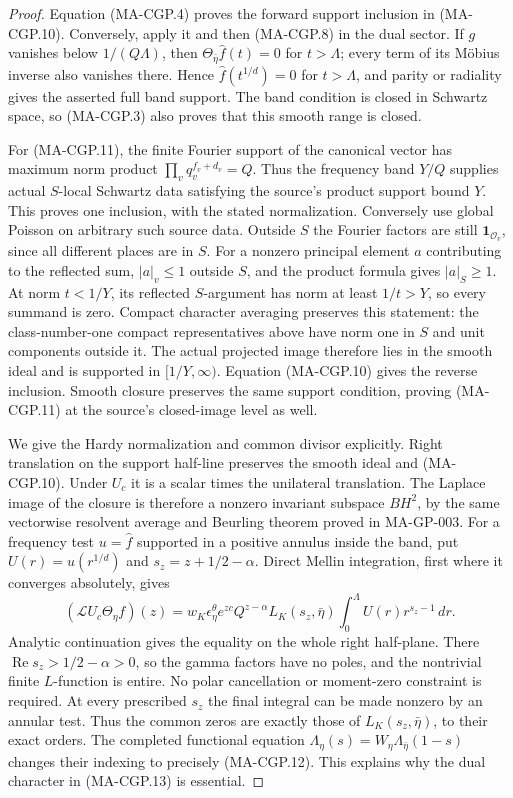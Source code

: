 \begin{proof}
Equation (MA-CGP.4) proves the forward support inclusion in
(MA-CGP.10).  Conversely, apply it and then (MA-CGP.8) in
the dual sector.  If $g$ vanishes below $1/(Q\Lambda)$,
then $\Theta_{\bar\eta}\widehat f(t)=0$ for $t>\Lambda$;
every term of its M\"obius inverse also vanishes there.
Hence $\widehat f(t^{1/d})=0$ for $t>\Lambda$, and parity
or radiality gives the asserted full band support.
The band condition is closed in Schwartz space, so (MA-CGP.3)
also proves that this smooth range is closed.

For (MA-CGP.11), the finite Fourier support of the canonical
vector has maximum norm product $\prod_v q_v^{f_v+d_v}=Q$.
Thus the frequency band $Y/Q$ supplies actual $S$-local
Schwartz data satisfying the source's product support bound
$Y$.  This proves one inclusion, with the stated normalization.
Conversely use global Poisson on arbitrary such source data.
Outside $S$ the Fourier factors are still $\mathbf1_{\mathcal O_v}$,
since all different places are in $S$.
For a nonzero principal element $a$ contributing to the reflected
sum, $|a|_v\le1$ outside $S$, and the product formula gives
$|a|_S\ge1$.  At norm $t<1/Y$, its reflected $S$-argument
has norm at least $1/t>Y$, so every summand is zero.
Compact character averaging preserves this statement: the
class-number-one compact representatives above have norm one
in $S$ and unit components outside it.
The actual projected image therefore lies in the smooth ideal
and is supported in $[1/Y,\infty)$.  Equation (MA-CGP.10)
gives the reverse inclusion.  Smooth closure preserves the
same support condition, proving (MA-CGP.11) at the source's
closed-image level as well.

We give the Hardy normalization and common divisor explicitly.
Right translation on the support half-line preserves the smooth
ideal and (MA-CGP.10).  Under $U_c$ it is a scalar times the
unilateral translation.  The Laplace image of the closure is
therefore a nonzero invariant subspace $BH^2$, by the same
vectorwise resolvent average and Beurling theorem proved in
MA-GP-003.
For a frequency test $u=\widehat f$ supported in a positive
annulus inside the band, put $U(r)=u(r^{1/d})$ and
$s_z=z+1/2-\alpha$.  Direct Mellin integration, first where
it converges absolutely, gives
\[
 (\mathcal L U_c\Theta_\eta f)(z)
   =w_K\epsilon_\eta^\theta e^{zc}Q^{z-\alpha}
          L_K(s_z,\bar\eta)
                   \int_0^\Lambda U(r)r^{s_z-1}\,dr.
 \tag{MA-CGP.13}
\]
Analytic continuation gives the equality on the whole right
half-plane.  There $\operatorname{Re}s_z>1/2-\alpha>0$,
so the gamma factors have no poles, and the nontrivial finite
$L$-function is entire.  No polar cancellation or moment-zero
constraint is required.  At every prescribed $s_z$ the final
integral can be made nonzero by an annular test.  Thus the
common zeros are exactly those of $L_K(s_z,\bar\eta)$,
to their exact orders.  The completed functional equation
$\Lambda_\eta(s)=W_\eta\Lambda_{\bar\eta}(1-s)$ changes
their indexing to precisely (MA-CGP.12).  This explains why
the dual character in (MA-CGP.13) is essential.


\end{proof}
